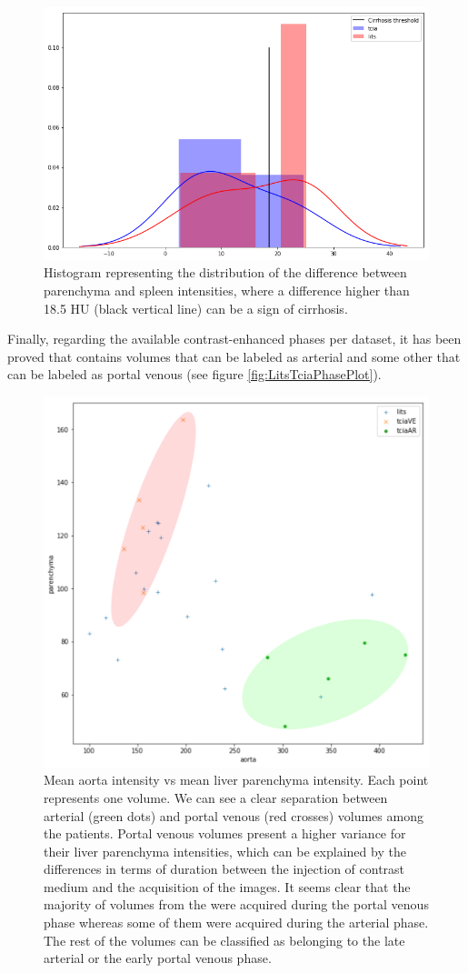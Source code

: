 {\begin{figure}[!ht]
\begin{mdframed}[backgroundcolor=blue!50,linecolor=blue!50]
		\label{fig:roiPlacement}
	\end{mdframed}
\end{figure}
\begin{figure}[!ht]
	\begin{mdframed}[backgroundcolor=blue!50,linecolor=blue!50]
		\centering
		\includegraphics[width=0.6\linewidth]{images/LITS_TCIA_cirrhosisPlot}
		\caption{Histogram representing the distribution of the difference between parenchyma and spleen intensities, where a difference higher than 18.5 HU (black vertical line) can be a sign of cirrhosis.}
		\label{fig:cirrhosisPlot}
	\end{mdframed}
\end{figure}
Finally, regarding the available contrast-enhanced phases per dataset, it has been proved that \textbf{} contains volumes that can be labeled as arterial and some other that can be labeled as portal venous (see figure \ref{fig:LitsTciaPhasePlot}).
\begin{figure}[!ht]
	\begin{mdframed}[backgroundcolor=blue!50,linecolor=blue!50]
		\centering
		\includegraphics[width=0.6\linewidth]{images/AortaParPlot}
		\caption{Mean aorta intensity vs mean liver parenchyma intensity. Each point represents one volume. We can see a clear separation between arterial (green dots) and portal venous (red crosses) volumes among the \textbf{} patients. Portal venous volumes present a higher variance for their liver parenchyma intensities, which can be explained by the differences in terms of duration between the injection of contrast medium and the acquisition of the images. It seems clear that the majority of volumes from the \textbf{} were acquired during the portal venous phase whereas some of them were acquired during the arterial phase. The rest of the volumes can be classified as belonging to the late arterial or the early portal venous phase.
}
\end{mdframed}
\end{figure}}
